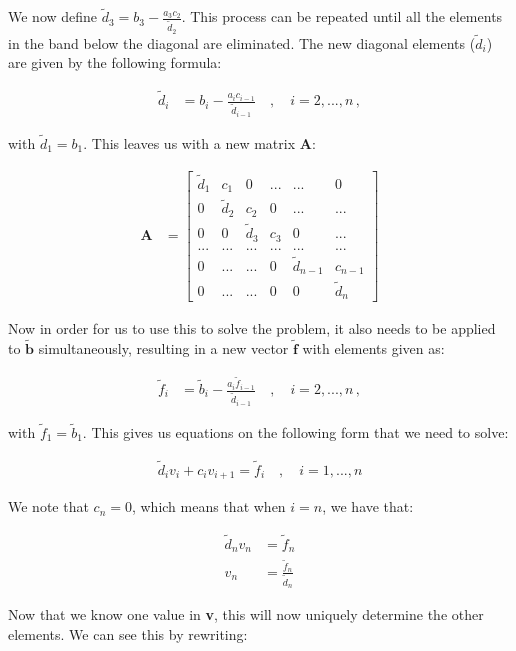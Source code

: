 \documentclass[english,notitlepage,reprint,nofootinbib]{revtex4-1}  %
\begin{document}
We now define $\tilde{d}_3 = b_3 - \frac{a_3c_2}{\tilde{d}_2}$. This process can be repeated until all the elements in the band below the diagonal are eliminated. The new diagonal elements ($\tilde{d}_i$) are given by the following formula:

\begin{align*}
\tilde{d}_i &= b_i - \frac{a_i c_{i-1}}{\tilde{d}_{i-1}} \quad , \quad i = 2,...,n \, ,
\end{align*}

with $\tilde{d}_1 = b_1$. This leaves us with a new matrix \textbf{A}:

\begin{align*}
\textbf{A} &= \begin{bmatrix}
\tilde{d}_1 & c_1 & 0 & ... & ... & 0 \\
0 & \tilde{d}_2 & c_2 & 0 & ... & ... \\
0 & 0 & \tilde{d}_3 & c_3 & 0 & ... \\
... & ... & ... & ... & ... & ... \\
0 & ... & ... & 0 & \tilde{d}_{n-1} & c_{n-1} \\
0 & ... & ... & 0 & 0 & \tilde{d}_n
\end{bmatrix}
\end{align*}


Now in order for us to use this to solve the problem, it also needs to be applied to $\tilde{\textbf{b}}$ simultaneously, resulting in a new vector $\tilde{\textbf{f}}$ with elements given as:

\begin{align*}
\tilde{f}_i &= \tilde{b}_i - \frac{a_i \tilde{f}_{i-1}}{\tilde{d}_{i-1}} \quad , \quad i = 2,...,n \, ,
\end{align*}

with $\tilde{f}_1 = \tilde{b}_1$. This gives us equations on the following form that we need to solve:

\begin{align*}
\tilde{d}_i v_i  + c_i v_{i+1} = \tilde{f}_i \quad , \quad i = 1,...,n
\end{align*}

We note that $c_n = 0$, which means that when $i=n$, we have that:

\begin{align*}
\tilde{d}_n v_n &= \tilde{f}_n \\
v_n &= \frac{\tilde{f}_n}{\tilde{d}_n}
\end{align*}

Now that we know one value in \textbf{v}, this will now uniquely determine the other elements. We can see this by rewriting:
\end{document}
